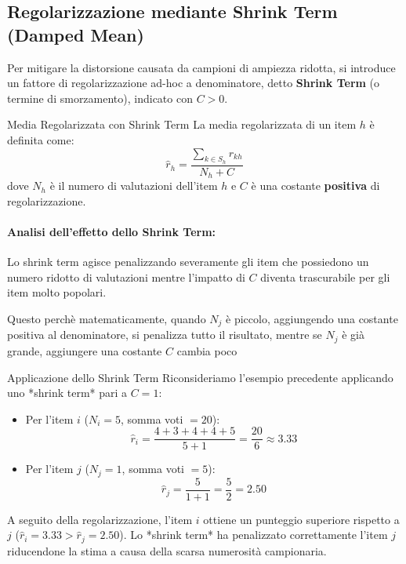 \subsection{Regolarizzazione mediante Shrink Term (Damped Mean)}
Per mitigare la distorsione causata da campioni di ampiezza ridotta, si introduce un fattore di regolarizzazione ad-hoc a denominatore, detto \textbf{Shrink Term} (o termine di smorzamento), indicato con $C > 0$.

\begin{definition}{Media Regolarizzata con Shrink Term}
La media regolarizzata di un item $h$ è definita come:
\[
\hat{r}_h = \frac{\sum_{k \in S_h} r_{kh}}{N_h + C}
\]
dove $N_h$ è il numero di valutazioni dell'item $h$ e $C$ è una costante \textbf{positiva} di regolarizzazione.
\end{definition}

\paragraph{Analisi dell'effetto dello Shrink Term:}
Lo shrink term agisce penalizzando severamente gli item che possiedono un numero ridotto di valutazioni mentre l'impatto di $C$ diventa trascurabile per gli item molto popolari.

Questo perchè matematicamente, quando $N_j$ è piccolo, aggiungendo una costante positiva al denominatore, si penalizza tutto il risultato, mentre se $N_j$ è già grande, aggiungere una costante $C$ cambia poco

\begin{example}{Applicazione dello Shrink Term}
Riconsideriamo l'esempio precedente applicando uno *shrink term* pari a $C = 1$:
\begin{itemize}
    \item Per l'item $i$ ($N_i = 5$, somma voti $= 20$):
    \[
    \hat{r}_i = \frac{4 + 3 + 4 + 4 + 5}{5 + 1} = \frac{20}{6} \approx 3.33
    \]
    \item Per l'item $j$ ($N_j = 1$, somma voti $= 5$):
    \[
    \hat{r}_j = \frac{5}{1 + 1} = \frac{5}{2} = 2.50
    \]
\end{itemize}
A seguito della regolarizzazione, l'item $i$ ottiene un punteggio superiore rispetto a $j$ ($\hat{r}_i = 3.33 > \hat{r}_j = 2.50$). Lo *shrink term* ha penalizzato correttamente l'item $j$ riducendone la stima a causa della scarsa numerosità campionaria.
\end{example}

